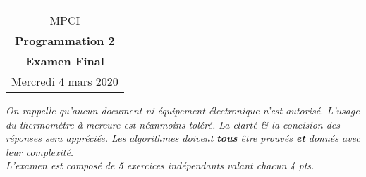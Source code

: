 \documentclass
[12pt]
{article}
\begin{document}
\begin{center}
  \begin{tabular}{c}
  \hline\\%
  {\textsc{MPCI}}\vspace{0.1cm}
  \\
%  
    {\bf {\Large Programmation 2}}\\\vspace{0.2cm}
    {\bf  { Examen Final}}\\
    {\footnotesize Mercredi 4 mars 2020}\\
    \hline
  \end{tabular}
\end{center}
\vspace{0.6cm}
%
%
{\em On rappelle qu'aucun document ni équipement électronique n'est autorisé. L'usage du thermomètre à mercure est néanmoins toléré. La clarté \& la concision des réponses sera appréciée. Les algorithmes doivent {\bf tous} être prouvés {\bf et} donnés avec leur complexité.}\\

{\em L'examen est composé de 5 exercices indépendants valant chacun 4 pts.}\\
\end{document}

